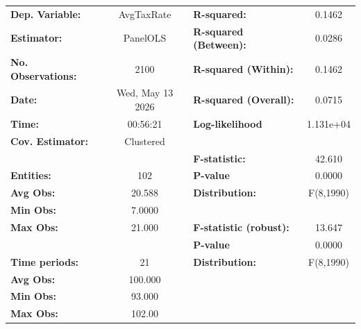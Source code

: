 \begin{center}
\begin{tabular}{lclc}
\toprule
\textbf{Dep. Variable:}                       &     AvgTaxRate     & \textbf{  R-squared:         }   &      0.1462      \\
\textbf{Estimator:}                           &      PanelOLS      & \textbf{  R-squared (Between):}  &      0.0286      \\
\textbf{No. Observations:}                    &        2100        & \textbf{  R-squared (Within):}   &      0.1462      \\
\textbf{Date:}                                &  Wed, May 13 2026  & \textbf{  R-squared (Overall):}  &      0.0715      \\
\textbf{Time:}                                &      00:56:21      & \textbf{  Log-likelihood     }   &    1.131e+04     \\
\textbf{Cov. Estimator:}                      &     Clustered      & \textbf{                     }   &                  \\
\textbf{}                                     &                    & \textbf{  F-statistic:       }   &      42.610      \\
\textbf{Entities:}                            &        102         & \textbf{  P-value            }   &      0.0000      \\
\textbf{Avg Obs:}                             &       20.588       & \textbf{  Distribution:      }   &    F(8,1990)     \\
\textbf{Min Obs:}                             &       7.0000       & \textbf{                     }   &                  \\
\textbf{Max Obs:}                             &       21.000       & \textbf{  F-statistic (robust):} &      13.647      \\
\textbf{}                                     &                    & \textbf{  P-value            }   &      0.0000      \\
\textbf{Time periods:}                        &         21         & \textbf{  Distribution:      }   &    F(8,1990)     \\
\textbf{Avg Obs:}                             &      100.000       & \textbf{                     }   &                  \\
\textbf{Min Obs:}                             &       93.000       & \textbf{                     }   &                  \\
\textbf{Max Obs:}                             &       102.00       & \textbf{                     }   &                  \\

\end{tabular}
\end{center}
